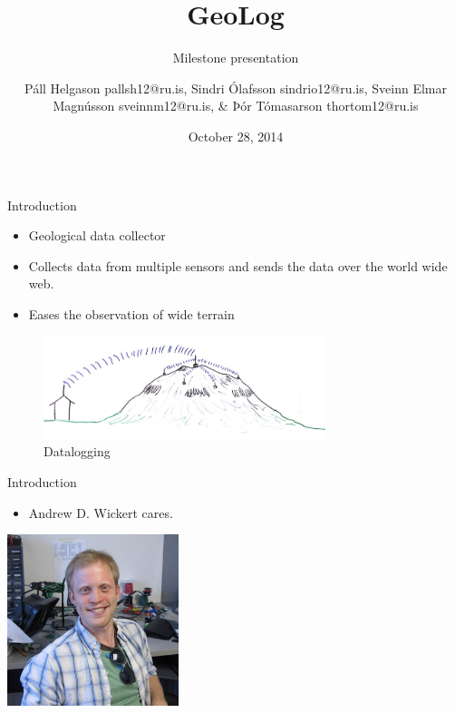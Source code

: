 \documentclass{beamer}
\title{GeoLog}
\subtitle{Milestone presentation}
\author[P. Helgasson, S. Ólafsson, S. Magnússon, \& Þ. Tómasarson]{Páll Helgason pallsh12@ru.is, Sindri Ólafsson sindrio12@ru.is, Sveinn Elmar Magnússon sveinnm12@ru.is, \& Þór Tómasarson thortom12@ru.is}
\institute[RU]{
  Department of Science and Engineering (TVD) \\
  Reykjavík University \\
}
\date{October 28, 2014} %
\begin{document}
\begin{frame}[plain]
  \titlepage
\end{frame}

\begin{frame}{Introduction}
	\begin{itemize}
	\item Geological data collector
	\item Collects data from multiple sensors and sends the data over the world wide web. 
	\item Eases the observation of wide terrain
	\end{itemize}
	\begin{figure}
			\centering
	        \includegraphics[height=3cm]{graphics/GeoLog.PNG}
	        \caption{Datalogging\cite{Helgason2014}}
	\end{figure}
\end{frame}

\begin{frame}{Introduction}
\begin{itemize}
\item Andrew D. Wickert cares.
\end{itemize}
\centering
\includegraphics[height=5cm]{graphics/andrewWickert.png}
\cite{andrewWickert}
\end{frame}
\end{document}
